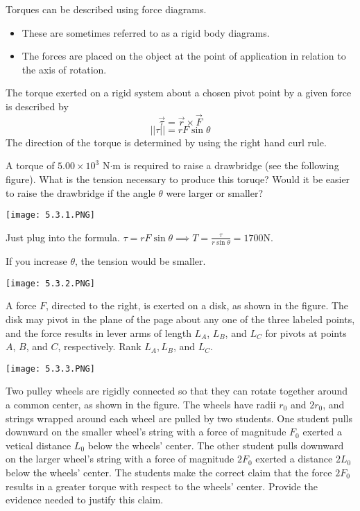 \documentclass[../mech.tex]{subfiles}
\begin{document}
Torques can be described using force diagrams.
\begin{itemize}
    \item These are sometimes referred to as a rigid body diagrams.
    \item The forces are placed on the object at the point of application in relation to the axis of rotation.
\end{itemize}

The torque exerted on a rigid system about a chosen pivot point by a given force is described by 
\[ \vec{\tau}=\vec{r}\times \vec{F} \]
\[ ||\tau||=rF\sin\theta \]
The direction of the torque is determined by using the right hand curl rule.

\begin{example}
    A torque of $5.00\times 10^3$ N$\cdot$m is required to raise a drawbridge (see the following figure). What is the tension necessary to produce this toruqe? Would it be easier to raise the drawbridge if the angle $\theta$ were larger or smaller?

    \begin{center}
        \texttt{[image: 5.3.1.PNG]}
    \end{center}

    Just plug into the formula. $\tau = rF\sin\theta \implies T=\frac{\tau}{r\sin\theta}=1700$N.

    If you increase $\theta$, the tension would be smaller.
\end{example}

\ex \begin{center}
    \texttt{[image: 5.3.2.PNG]}
\end{center}
A force $F$, directed to the right, is exerted on a disk, as shown in the figure. The disk may pivot in the plane of the page about any one of the three labeled points, and the force results in lever arms of length $L_A$, $L_B$, and $L_C$ for pivots at points $A$, $B$, and $C$, respectively. 
Rank $L_A,L_B$, and $L_C$.

\ex \begin{center}
    \texttt{[image: 5.3.3.PNG]}
\end{center}
Two pulley wheels are rigidly connected so that they can rotate together around a common center, as shown in the figure. The wheels have radii $r_0$ and $2r_0$, and strings wrapped around each wheel are pulled by two students.
One student pulls downward on the smaller wheel's string with a force of magnitude $F_0$ exerted a vetical distance $L_0$ below the wheels' center. The other student pulls downward on the larger wheel's string with a force of magnitude 
$2F_0$ exerted a distance $2L_0$ below the wheels' center. The students make the correct claim that the force $2F_0$ results in a greater torque with respect to the wheels' center. Provide the evidence needed to justify this claim.
\end{document}
